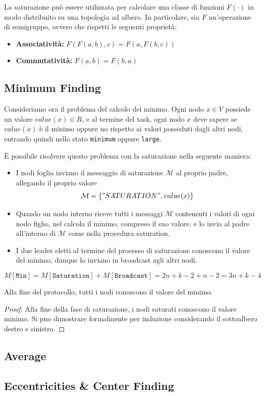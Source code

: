 La saturazione può essere utilizzata per calcolare una classe di funzioni $F(\cdot)$ in modo distribuito su una topologia ad albero. In particolare, sia $F$ un'operazione di semigruppo, ovvero che rispetti le seguenti proprietà:
\begin{itemize}
    \item \textbf{Associatività:} $F(F(a, b), c) = F(a, F(b, c))$
    \item \textbf{Commutatività:} $F(a, b) = F(b, a)$
\end{itemize} 

\subsection{Minimum Finding}

Consideriamo ora il problema del calcolo del minimo. Ogni nodo $x \in V$ possiede un valore $value(x) \in R$, e al termine del task, ogni nodo $x$ deve sapere se $value(x)$ è il minimo oppure no rispetto ai valori posseduti dagli altri nodi, entrando quindi nello stato \texttt{minimum} oppure \texttt{large}.

È possibile risolvere questo problema con la saturazione nella seguente maniera:

\begin{itemize}
    \item I nodi foglia inviano il messaggio di saturazione $\mathcal{M}$ al proprio padre, allegando il proprio valore
    \[
        \mathcal{M} = \{"SATURATION", value(x)\}
    \]
    \item Quando un nodo interno riceve tutti i messaggi $\mathcal{M}$ contenenti i valori di ogni nodo figlio, nel calcola il minimo, compreso il suo valore, e lo invia al padre all'interno di $\mathcal{M}$ come nella procedura saturation.
    \item I due leader eletti al termine del processo di saturazione conoscono il valore del minimo, dunque lo inviano in broadcast agli altri nodi.
\end{itemize}

\begin{teorema}
    \[
        M[\texttt{Min}] = M[\texttt{Saturation}] + M[\texttt{Broadcast}] = 2n + k - 2 + n - 2 = 3n + k - 4
    \]
\end{teorema}

\begin{teorema}[Correttezza]
    Alla fine del protocollo, tutti i nodi conoscono il valore del minimo.
    \begin{proof}
        Alla fine della fase di saturazione, i nodi saturati conoscono il valore minimo. Si puo dimostrare formalmente per induzione considerando il sottoalbero destro e sinistro.
    \end{proof}
\end{teorema}

\subsection{Average}

\subsection{Eccentricities \& Center Finding}